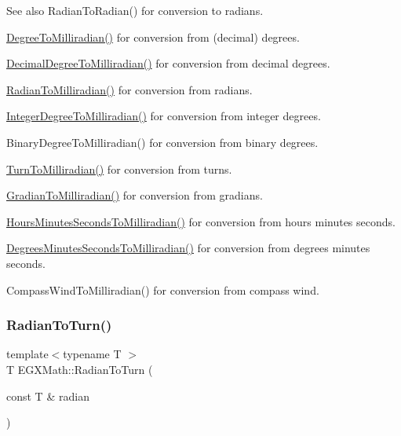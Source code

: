 \begin{DoxySeeAlso}{See also}
Radian\+To\+Radian() for conversion to radians. 

\mbox{\hyperlink{group___e_g_x_math-_angle_conversions-_degree_gae4fa6c2d3805430760783650cfbfdb11}{Degree\+To\+Milliradian()}} for conversion from (decimal) degrees. 

\mbox{\hyperlink{group___e_g_x_math-_angle_conversions-_decimal_degree_gab567d02d4692d9642a4ad219e479713a}{Decimal\+Degree\+To\+Milliradian()}} for conversion from decimal degrees. 

\mbox{\hyperlink{group___e_g_x_math-_angle_conversions-_radian_gaea391f0cca39b05e298dd1cae162e7f1}{Radian\+To\+Milliradian()}} for conversion from radians. 

\mbox{\hyperlink{group___e_g_x_math-_angle_conversions-_integer_degree_ga5379a68bdff5cc4fab5bb1ba06ef9453}{Integer\+Degree\+To\+Milliradian()}} for conversion from integer degrees. 

Binary\+Degree\+To\+Milliradian() for conversion from binary degrees. 

\mbox{\hyperlink{group___e_g_x_math-_angle_conversions-_turn_ga2aea2621472294ce4c25ac7e55db51c6}{Turn\+To\+Milliradian()}} for conversion from turns. 

\mbox{\hyperlink{group___e_g_x_math-_angle_conversions-_gradian_ga144f1019dc760268a163d81fcb3ce482}{Gradian\+To\+Milliradian()}} for conversion from gradians. 

\mbox{\hyperlink{group___e_g_x_math-_angle_conversions-_hours_minutes_seconds_gad78a90abaed52ca9d5fe6b4287c4a5f3}{Hours\+Minutes\+Seconds\+To\+Milliradian()}} for conversion from hours minutes seconds. 

\mbox{\hyperlink{group___e_g_x_math-_angle_conversions-_degrees_minutes_seconds_gacadb912be6af5dac1db702db86a69eeb}{Degrees\+Minutes\+Seconds\+To\+Milliradian()}} for conversion from degrees minutes seconds. 

Compass\+Wind\+To\+Milliradian() for conversion from compass wind. 
\end{DoxySeeAlso}
\mbox{\label{group___e_g_x_math-_angle_conversions-_radian_ga8492d6d2f6467c619b65e5fb75a9ae04}} 
\subsubsection{\texorpdfstring{Radian\+To\+Turn()}{RadianToTurn()}}
{\footnotesize\ttfamily template$<$typename T $>$ \\
T E\+G\+X\+Math\+::\+Radian\+To\+Turn (\begin{DoxyParamCaption}\item[{const T \&}]{radian }\end{DoxyParamCaption})}



